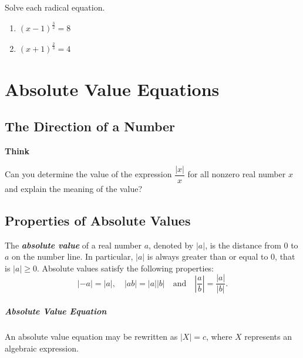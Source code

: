 \documentclass[en,12pt]{elegantbook}
\providecommand{\tightlist}{%
  \setlength{\itemsep}{0pt}\setlength{\parskip}{0pt}}
\newenvironment{rmdthink}{
	\par\noindent
	{
		\makebox[-\width][r]{
			\footnotesize
			\color{green!90}\faLightbulbO
			\hspace*{3pt}
		}
			\textbf{
				\color{second}
				Think 
			}
    }
    \begin{shaded}
    \sffamily
}{
    \par\medskip\ignorespacesafterend
    \end{shaded}
}
\providecommand{\tightlist}{%
  \setlength{\itemsep}{0pt}\setlength{\parskip}{0pt}}
\let\BeginKnitrBlock\begin \let\EndKnitrBlock\end
\begin{document}
\BeginKnitrBlock{exercise}
\protect\hypertarget{exr:unnamed-chunk-173}{}{\label{exr:unnamed-chunk-173} }
Solve each radical equation.

\begin{enumerate}
\def\labelenumi{\arabic{enumi}.}
\tightlist
\item
  \((x-1)^{\frac32}=8\)
\item
  \((x+1)^{\frac23}=4\)
\end{enumerate}
\EndKnitrBlock{exercise}

\hypertarget{absolute-value-equations}{%
\chapter{Absolute Value Equations}\label{absolute-value-equations}}

\hypertarget{the-direction-of-a-number}{%
\section{The Direction of a Number}\label{the-direction-of-a-number}}

\begin{rmdthink}

Can you determine the value of the expression \(\dfrac{|x|}{x}\) for all nonzero real number \(x\) and explain the meaning of the value?

\end{rmdthink}

\hypertarget{properties-of-absolute-values}{%
\section{Properties of Absolute Values}\label{properties-of-absolute-values}}

The \textbf{\emph{absolute value}} of a real number \(a\), denoted by \(|a|\), is the distance from \(0\) to \(a\) on the number line. In particular, \(|a|\) is always greater than or equal to \(0\), that is \(|a|\geq 0\). Absolute values satisfy the following properties:
\[
|-a|=|a|, \quad |ab|=|a||b| \quad \text{and} \quad \left|\frac{a}{b}\right|=\frac{|a|}{|b|}.
\]

\paragraph*{Absolute Value Equation}

An absolute value equation may be rewritten as \(|X|=c\), where \(X\) represents an algebraic expression.
\end{document}
